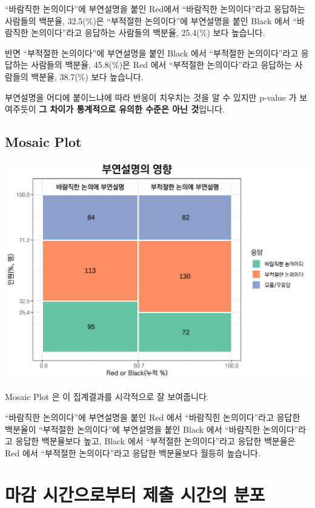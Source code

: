 \documentclass[
]{book}
\begin{document}
``바람직한 논의이다''에 부연설명을 붙인 Red에서 ``바람직한 논의이다''라고 응답하는 사람들의 백분율, 32.5(\%)은 ``부적절한 논의이다''에 부연설명을 붙인 Black 에서 ``바람직한 논의이다''라고 응답하는 사람들의 백분율, 25.4(\%) 보다 높습니다.

반면 ``부적절한 논의이다''에 부연설명을 붙인 Black 에서 ``부적절한 논의이다''라고 응답하는 사람들의 백분율, 45.8(\%)은 Red 에서 ``부적절한 논의이다''라고 응답하는 사람들의 백분율, 38.7(\%) 보다 높습니다.

부연설명을 어디에 붙이느냐에 따라 반응이 치우치는 것을 알 수 있지만 p-value 가 보여주듯이 \textbf{그 차이가 통계적으로 유의한 수준은 아닌 것}입니다.

\subsection{Mosaic Plot}\label{mosaic-plot}

\includegraphics{Quiz_report_2025_files/figure-latex/unnamed-chunk-14-1.pdf}

Mosaic Plot 은 이 집계결과를 시각적으로 잘 보여줍니다.

``바람직한 논의이다''에 부연설명을 붙인 Red 에서 ``바람직힌 논의이다''라고 응답한 백분율이 ``부적절한 논의이다''에 부연설명을 붙인 Black 에서 ``바람직한 논의이다''라고 응답한 백분율보다 높고, Black 에서 ``부적절한 논의이다''라고 응답한 백분율은 Red 에서 ``부적절한 논의이다''라고 응답한 백분율보다 월등히 높습니다.

\section{마감 시간으로부터 제출 시간의 분포}\label{uxb9c8uxac10-uxc2dcuxac04uxc73cuxb85cuxbd80uxd130-uxc81cuxcd9c-uxc2dcuxac04uxc758-uxbd84uxd3ec}
\end{document}
